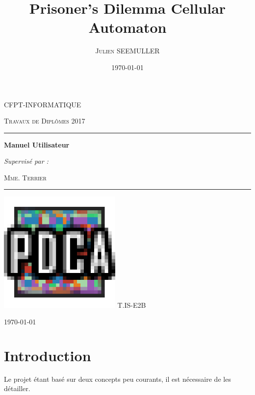 \documentclass[a4paper, french]{article}
\title{Prisoner's Dilemma Cellular Automaton}
\author{\textsc{Julien SEEMULLER}}
\date{\today}
\newcommand{\subtitle}{Manuel Utilisateur}
\newcommand{\lesson}{Travaux de Diplômes 2017}
\newcommand{\class}{T.IS-E2B}
\newcommand{\teacher}{Mme. Terrier}
\begin{document}
\begin{titlepage}
	\centering
	{\scshape\LARGE CFPT-INFORMATIQUE \par}
	\vspace{0.25cm}
	{\scshape\lesson\par}
	\vspace{3cm}
	
	\hrule
	{\huge\bfseries\textsc\@title\par}
	{\Large\bfseries\textsc\subtitle\par}
	\vspace{0.5cm}
	{\itshape\@author\par}
	\vspace{1cm}
	{\textit{Supervisé par :}  \par \textsc{\teacher}}\par
	\vspace{0.5cm}
	\hrule
	
	\vfill
	\includegraphics[width=6cm]{logo.png}
	\vfill
	\textsc{\class}
	\vspace{1cm}
	
	{\large\today\par}
\end{titlepage}
\pagebreak
\tableofcontents

\pagebreak
\section{Introduction}
Le projet étant basé sur deux concepts peu courants, il est nécessaire de les détailler.
\end{document}
